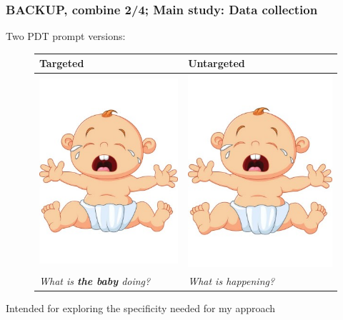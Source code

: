 \documentclass[handout,xcolor={dvipsnames}]{beamer}
\begin{document}
\begin{frame}
\frametitle{BACKUP, combine 2/4; Main study: Data collection}

Two PDT prompt versions:
\begin{figure}[htb!]
\begin{center}
\begin{tabular}{|C{50mm}|C{50mm}|}
\hline
\textbf{Targeted} & \textbf{Untargeted} \\
\hline
{\includegraphics[trim=0 50 0 50,clip,width=0.33\columnwidth]{figures/I10.jpg}} & {\includegraphics[trim=0 50 0 50,clip,width=0.33\columnwidth]{figures/I10.jpg}} \\
\hline
\textit{What is \textbf{the baby} doing?} & \textit{What is happening?} \\
\hline
\end{tabular}
\end{center}
\end{figure}

Intended for exploring the specificity needed for my approach

\end{frame}
\end{document}
